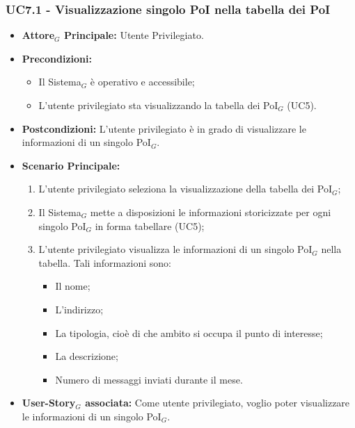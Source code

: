 \documentclass[10pt]{article}
\begin{document}
\begin{justify}
\subsubsection{\textbf{UC7.1 - Visualizzazione singolo PoI nella tabella dei PoI}}
\label{UC7.1}
\begin{itemize}
    \item \textbf{Attore$_G$ Principale:} Utente Privilegiato.
    \item \textbf{Precondizioni:} 
        \begin{itemize}
          \item Il Sistema$_G$ è operativo e accessibile;
            \item L'utente privilegiato sta visualizzando la tabella dei PoI$_G$ (UC5).
        \end{itemize}
      \item \textbf{Postcondizioni:} L'utente privilegiato è in grado di visualizzare le informazioni di un singolo PoI$_G$.
    \item \textbf{Scenario Principale:} 
        \begin{enumerate}
        \item L'utente privilegiato seleziona la visualizzazione della tabella dei PoI$_G$;
          \item Il Sistema$_G$ mette a disposizioni le informazioni storicizzate per ogni singolo PoI$_G$ in forma tabellare (UC5);
          \item L'utente privilegiato visualizza le informazioni di un singolo PoI$_G$ nella tabella. Tali informazioni sono:
        \begin{itemize}
       \item Il nome;
       \item L'indirizzo;
       \item La tipologia, cioè di che ambito si occupa il punto di interesse;
       \item La descrizione;
         \item Numero di messaggi inviati durante il mese.
        \end{itemize}
        \end{enumerate}
    \item \textbf{User-Story$_G$ associata:} Come utente privilegiato, voglio poter visualizzare le informazioni di un singolo PoI$_G$.
\end{itemize}


\end{justify}
\end{document}
